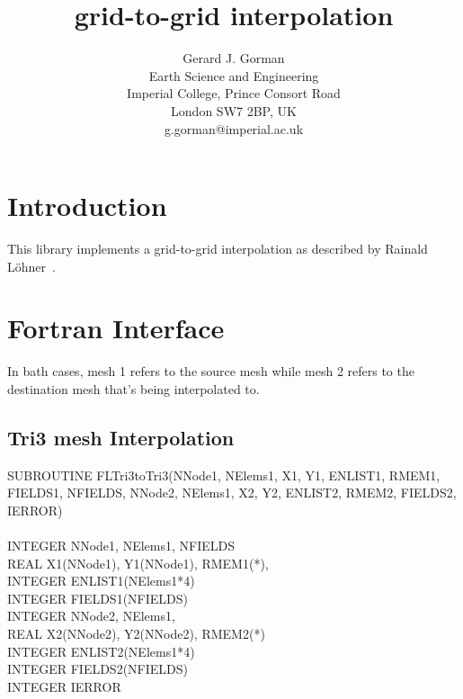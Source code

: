 \documentclass[a4paper]{article}
\begin{document}
\title{grid-to-grid interpolation}

\author{Gerard J. Gorman\\ 
Earth Science and Engineering\\
Imperial College, Prince Consort Road\\ 
London SW7 2BP, UK\\
g.gorman@imperial.ac.uk}
\maketitle
\thispagestyle{empty}


\section{Introduction}

This library implements a grid-to-grid interpolation as described by
Rainald L\"{o}hner~\cite{lohner_grid2grid}.

\section{Fortran Interface}

In bath cases, mesh 1 refers to the source mesh while mesh 2 refers to
the destination mesh that's being interpolated to.

\subsection{Tri3 mesh Interpolation}
SUBROUTINE FLTri3toTri3(NNode1, NElems1, X1, Y1, 
                        ENLIST1, RMEM1, FIELDS1, NFIELDS,
                        NNode2, NElems1, X2, Y2,
                        ENLIST2, RMEM2, FIELDS2, IERROR)\\
\\
\noindent INTEGER NNode1, NElems1, NFIELDS         \\
REAL X1(NNode1), Y1(NNode1), RMEM1(*),             \\
INTEGER ENLIST1(NElems1*4)                         \\
INTEGER FIELDS1(NFIELDS)                           \\
INTEGER NNode2, NElems1,                           \\
REAL X2(NNode2), Y2(NNode2), RMEM2(*)              \\
INTEGER ENLIST2(NElems1*4)                         \\
INTEGER FIELDS2(NFIELDS)                           \\
INTEGER IERROR
\end{document}
